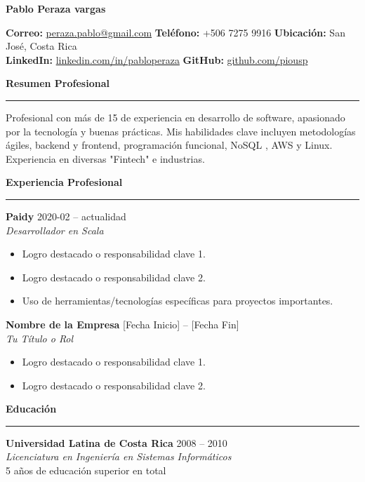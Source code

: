 \documentclass[a4paper,10pt]{article}
\newcommand{\header}[1]{
	\par{\centering\huge\textbf{#1}\par}
	\vspace{5pt}
}
\newcommand{\sectiontitle}[1]{
	\vspace{10pt}
	{\large\textbf{#1}}
	\vspace{5pt}
	\hrule
	\vspace{5pt}
}
\begin{document}
	
	\header{Pablo Peraza vargas}
	
	\centering
	\textbf{Correo:} \href{mailto:peraza.pablo@gmail.com}{peraza.pablo@gmail.com} \quad
	\textbf{Teléfono:} +506 7275 9916\quad
	\textbf{Ubicación:} San José, Costa Rica\\
	\textbf{LinkedIn:} \href{https://linkedin.com/in/pabloperaza}{linkedin.com/in/pabloperaza} \quad
	\textbf{GitHub:} \href{https://github.com/piousp}{github.com/piousp} 
	\par
	\vspace{10pt}
	
	\sectiontitle{Resumen Profesional}
	Profesional con más de 15 de experiencia en desarrollo de software, apasionado por la tecnología y buenas prácticas. Mis habilidades clave incluyen metodologías ágiles, backend y frontend, programación funcional, NoSQL , AWS y Linux. Experiencia en diversas "Fintech" e industrias.
	
	\sectiontitle{Experiencia Profesional}
	\textbf{Paidy} \hfill 2020-02 -- actualidad \\
	\emph{Desarrollador en Scala} \\
	\begin{itemize}[leftmargin=*]
		\item Logro destacado o responsabilidad clave 1.
		\item Logro destacado o responsabilidad clave 2.
		\item Uso de herramientas/tecnologías específicas para proyectos importantes.
	\end{itemize}
	
	\textbf{Nombre de la Empresa} \hfill [Fecha Inicio] -- [Fecha Fin] \\
	\emph{Tu Título o Rol} \\
	\begin{itemize}[leftmargin=*]
		\item Logro destacado o responsabilidad clave 1.
		\item Logro destacado o responsabilidad clave 2.
	\end{itemize}
	
	\sectiontitle{Educación}
	\textbf{Universidad Latina de Costa Rica} \hfill 2008 -- 2010 \\
	\emph{Licenciatura en Ingeniería en Sistemas Informáticos} \\
	5 años de educación superior en total \\
	
\end{document}
